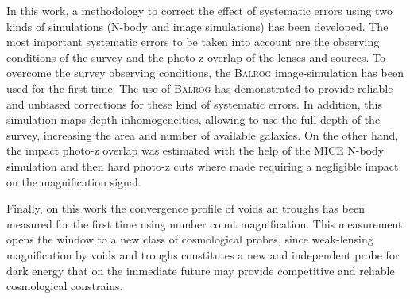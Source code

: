 In this work, a methodology to correct the effect of systematic errors using two kinds of simulations (N-body and image simulations) has been developed. The most important systematic errors to be taken into account are the observing conditions of the survey and the photo-z overlap of the lenses and sources. To overcome the survey observing conditions, the {\scshape Balrog} image-simulation has been used for the first time. The use of {\scshape Balrog} has demonstrated to provide reliable and unbiased corrections for these kind of systematic errors. In addition, this simulation maps depth inhomogeneities, allowing to use the full depth of the survey, increasing the area and number of available galaxies. On the other hand, the impact photo-z overlap was estimated with the help of the MICE N-body simulation and then hard photo-z cuts where made requiring a negligible impact on the magnification signal.
\newline

Finally, on this work the convergence profile of voids an troughs has been measured for the first time using number count magnification. This measurement opens the window to a new class of cosmological probes, since weak-lensing magnification by voids and troughs constitutes a new and independent probe for dark energy that on the immediate future may provide competitive and reliable cosmological constrains.

